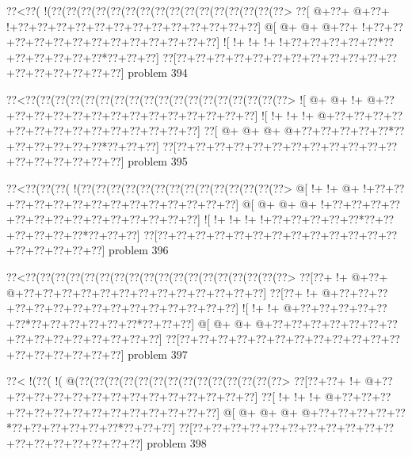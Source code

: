 \vbox{\vbox{\goo
\0??<\0??(\- !(\0??(\0??(\0??(\0??(\0??(\0??(\0??(\0??(\0??(\0??(\0??(\0??(\0??(\0??(\0??(\0??>
\0??[\- @+\0??+\- @+\0??+\- !+\0??+\0??+\0??+\0??+\0??+\0??+\0??+\0??+\0??+\0??+\0??+\0??+\0??]
\- @[\- @+\- @+\- @+\0??+\- !+\0??+\0??+\0??+\0??+\0??+\0??+\0??+\0??+\0??+\0??+\0??+\0??+\0??]
\- ![\- !+\- !+\- !+\- !+\0??+\0??+\0??+\0??+\0??*\0??+\0??+\0??+\0??+\0??+\0??*\0??+\0??+\0??]
\0??[\0??+\0??+\0??+\0??+\0??+\0??+\0??+\0??+\0??+\0??+\0??+\0??+\0??+\0??+\0??+\0??+\0??+\0??]
}
\hfil problem 394\hfil\break
}



\vbox{\vbox{\goo
\0??<\0??(\0??(\0??(\0??(\0??(\0??(\0??(\0??(\0??(\0??(\0??(\0??(\0??(\0??(\0??(\0??(\0??(\0??>
\- ![\- @+\- @+\- !+\- @+\0??+\0??+\0??+\0??+\0??+\0??+\0??+\0??+\0??+\0??+\0??+\0??+\0??+\0??]
\- ![\- !+\- !+\- !+\- @+\0??+\0??+\0??+\0??+\0??+\0??+\0??+\0??+\0??+\0??+\0??+\0??+\0??+\0??]
\0??[\- @+\- @+\- @+\- @+\0??+\0??+\0??+\0??+\0??*\0??+\0??+\0??+\0??+\0??+\0??*\0??+\0??+\0??]
\0??[\0??+\0??+\0??+\0??+\0??+\0??+\0??+\0??+\0??+\0??+\0??+\0??+\0??+\0??+\0??+\0??+\0??+\0??]
}
\hfil problem 395\hfil\break
}



\vbox{\vbox{\goo
\0??<\0??(\0??(\0??(\- !(\0??(\0??(\0??(\0??(\0??(\0??(\0??(\0??(\0??(\0??(\0??(\0??(\0??(\0??>
\- @[\- !+\- !+\- @+\- !+\0??+\0??+\0??+\0??+\0??+\0??+\0??+\0??+\0??+\0??+\0??+\0??+\0??+\0??]
\- @[\- @+\- @+\- @+\- !+\0??+\0??+\0??+\0??+\0??+\0??+\0??+\0??+\0??+\0??+\0??+\0??+\0??+\0??]
\- ![\- !+\- !+\- !+\- !+\0??+\0??+\0??+\0??+\0??*\0??+\0??+\0??+\0??+\0??+\0??*\0??+\0??+\0??]
\0??[\0??+\0??+\0??+\0??+\0??+\0??+\0??+\0??+\0??+\0??+\0??+\0??+\0??+\0??+\0??+\0??+\0??+\0??]
}
\hfil problem 396\hfil\break
}



\vbox{\vbox{\goo
\0??<\0??(\0??(\0??(\0??(\0??(\0??(\0??(\0??(\0??(\0??(\0??(\0??(\0??(\0??(\0??(\0??(\0??(\0??>
\0??[\0??+\- !+\- @+\0??+\- @+\0??+\0??+\0??+\0??+\0??+\0??+\0??+\0??+\0??+\0??+\0??+\0??+\0??]
\0??[\0??+\- !+\- @+\0??+\0??+\0??+\0??+\0??+\0??+\0??+\0??+\0??+\0??+\0??+\0??+\0??+\0??+\0??]
\- ![\- !+\- !+\- @+\0??+\0??+\0??+\0??+\0??+\0??*\0??+\0??+\0??+\0??+\0??+\0??*\0??+\0??+\0??]
\- @[\- @+\- @+\- @+\0??+\0??+\0??+\0??+\0??+\0??+\0??+\0??+\0??+\0??+\0??+\0??+\0??+\0??+\0??]
\0??[\0??+\0??+\0??+\0??+\0??+\0??+\0??+\0??+\0??+\0??+\0??+\0??+\0??+\0??+\0??+\0??+\0??+\0??]
}
\hfil problem 397\hfil\break
}



\vbox{\vbox{\goo
\0??<\- !(\0??(\- !(\- @(\0??(\0??(\0??(\0??(\0??(\0??(\0??(\0??(\0??(\0??(\0??(\0??(\0??(\0??>
\0??[\0??+\0??+\- !+\- @+\0??+\0??+\0??+\0??+\0??+\0??+\0??+\0??+\0??+\0??+\0??+\0??+\0??+\0??]
\0??[\- !+\- !+\- !+\- @+\0??+\0??+\0??+\0??+\0??+\0??+\0??+\0??+\0??+\0??+\0??+\0??+\0??+\0??]
\- @[\- @+\- @+\- @+\- @+\0??+\0??+\0??+\0??+\0??*\0??+\0??+\0??+\0??+\0??+\0??*\0??+\0??+\0??]
\0??[\0??+\0??+\0??+\0??+\0??+\0??+\0??+\0??+\0??+\0??+\0??+\0??+\0??+\0??+\0??+\0??+\0??+\0??]
}
\hfil problem 398\hfil\break
}



